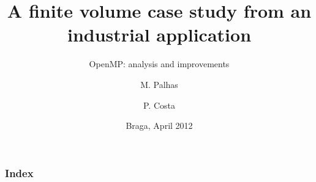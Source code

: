 \documentclass{beamer}
\title[OpenMP: analyze \& improve]{A finite volume case study from an industrial application}
\subtitle{OpenMP: analysis and improvements}
\author{M. Palhas \and P. Costa}
\institute[19808 \and 19830]{
	University of Minho\\
	Department of Informatics
}
\date{Braga, April 2012}
\begin{document}

\maketitle%

\begin{frame}
	\frametitle{Index}
	\tableofcontents
\end{frame}

%
\end{document}
